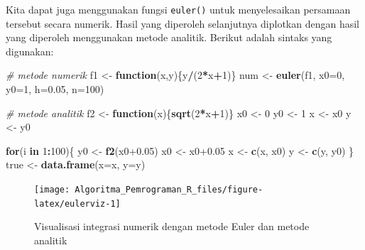 \documentclass[
]{book}
\newenvironment{Shaded}{\begin{snugshade}}{\end{snugshade}}
\newcommand{\AttributeTok}[1]{\textcolor[rgb]{0.13,0.29,0.53}{#1}}
\newcommand{\CommentTok}[1]{\textcolor[rgb]{0.56,0.35,0.01}{\textit{#1}}}
\newcommand{\ControlFlowTok}[1]{\textcolor[rgb]{0.13,0.29,0.53}{\textbf{#1}}}
\newcommand{\DecValTok}[1]{\textcolor[rgb]{0.00,0.00,0.81}{#1}}
\newcommand{\FloatTok}[1]{\textcolor[rgb]{0.00,0.00,0.81}{#1}}
\newcommand{\FunctionTok}[1]{\textcolor[rgb]{0.13,0.29,0.53}{\textbf{#1}}}
\newcommand{\NormalTok}[1]{#1}
\newcommand{\OtherTok}[1]{\textcolor[rgb]{0.56,0.35,0.01}{#1}}
\newcommand{\SpecialCharTok}[1]{\textcolor[rgb]{0.81,0.36,0.00}{\textbf{#1}}}
\theoremstyle{definition}
\theoremstyle{definition}
\theoremstyle{definition}
\theoremstyle{definition}
\theoremstyle{remark}
\begin{document}
Kita dapat juga menggunakan fungsi \texttt{euler()} untuk menyelesaikan persamaan tersebut secara numerik. Hasil yang diperoleh selanjutnya diplotkan dengan hasil yang diperoleh menggunakan metode analitik. Berikut adalah sintaks yang digunakan:

\begin{Shaded}
\begin{Highlighting}[]
\CommentTok{\# metode numerik}
\NormalTok{f1 }\OtherTok{\textless{}{-}} \ControlFlowTok{function}\NormalTok{(x,y)\{y}\SpecialCharTok{/}\NormalTok{(}\DecValTok{2}\SpecialCharTok{*}\NormalTok{x}\SpecialCharTok{+}\DecValTok{1}\NormalTok{)\}}
\NormalTok{num }\OtherTok{\textless{}{-}} \FunctionTok{euler}\NormalTok{(f1, }\AttributeTok{x0=}\DecValTok{0}\NormalTok{, }\AttributeTok{y0=}\DecValTok{1}\NormalTok{, }\AttributeTok{h=}\FloatTok{0.05}\NormalTok{, }\AttributeTok{n=}\DecValTok{100}\NormalTok{)}

\CommentTok{\# metode analitik}
\NormalTok{f2 }\OtherTok{\textless{}{-}} \ControlFlowTok{function}\NormalTok{(x)\{}\FunctionTok{sqrt}\NormalTok{(}\DecValTok{2}\SpecialCharTok{*}\NormalTok{x}\SpecialCharTok{+}\DecValTok{1}\NormalTok{)\}}
\NormalTok{x0 }\OtherTok{\textless{}{-}} \DecValTok{0}
\NormalTok{y0 }\OtherTok{\textless{}{-}} \DecValTok{1}
\NormalTok{x }\OtherTok{\textless{}{-}}\NormalTok{ x0}
\NormalTok{y }\OtherTok{\textless{}{-}}\NormalTok{ y0}

\ControlFlowTok{for}\NormalTok{(i }\ControlFlowTok{in} \DecValTok{1}\SpecialCharTok{:}\DecValTok{100}\NormalTok{)\{}
\NormalTok{  y0 }\OtherTok{\textless{}{-}} \FunctionTok{f2}\NormalTok{(x0}\FloatTok{+0.05}\NormalTok{)}
\NormalTok{  x0 }\OtherTok{\textless{}{-}}\NormalTok{ x0}\FloatTok{+0.05}
\NormalTok{  x }\OtherTok{\textless{}{-}} \FunctionTok{c}\NormalTok{(x, x0)}
\NormalTok{  y }\OtherTok{\textless{}{-}} \FunctionTok{c}\NormalTok{(y, y0)}
\NormalTok{\}}
\NormalTok{true }\OtherTok{\textless{}{-}} \FunctionTok{data.frame}\NormalTok{(}\AttributeTok{x=}\NormalTok{x, }\AttributeTok{y=}\NormalTok{y)}
\end{Highlighting}
\end{Shaded}

\begin{figure}

{\centering \texttt{[image: Algoritma\_Pemrograman\_R\_files/figure-latex/eulerviz-1]} 

}

\caption{Visualisasi integrasi numerik dengan metode Euler dan metode analitik}\label{fig:eulerviz}
\end{figure}
\end{document}
